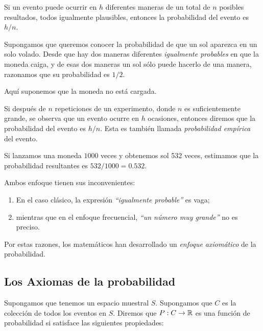 Si un evento puede ocurrir en $h$ diferentes maneras de un total de $n$ posibles resultados, todos igualmente plausibles, entonces la probabilidad del evento es $h/n.$


\begin{ejemplo}
	\label{exmp:1.10}
	Supongamos que queremos conocer la probabilidad de que un sol aparezca en un solo volado.  Desde que hay dos maneras diferentes \emph{igualmente probables} en que la moneda caiga,  y de esas dos maneras un sol sólo puede hacerlo de una manera, razonamos que su probabilidad es $1/2.$
	
	
	\begin{observacion}
		Aquí suponemos que la moneda no está cargada.
	\end{observacion}
	
\end{ejemplo}


Si después de $n$ repeticiones de un experimento, donde $n$ es suficientemente grande, se observa que un evento ocurre en $h$ ocasiones, entonces diremos que la probabilidad del evento es $h/n.$  Esta es también llamada \emph{probabilidad empírica} del evento.


\begin{ejemplo}
	\label{exmp:1.11}
	Si lanzamos una moneda $1000$ veces y obtenemos sol 532 veces, estimamos que la probabilidad resultantes es $532/1000=0.532$.
\end{ejemplo}



\begin{observacion}
	Ambos enfoque tienen sus inconvenientes:
	\begin{enumerate}
		\item En el caso clásico, la expresión \emph{``igualmente probable''} es vaga; 
		\item mientras que en el enfoque frecuencial, \emph{``un número muy grande''} no es preciso. 
	\end{enumerate}
	Por estas razones, los matemáticos han desarrollado un \emph{enfoque axiomático} de la probabilidad.
\end{observacion}


\subsection{Los Axiomas de la probabilidad}

Supongamos que tenemos un espacio muestral $S.$ Supongamos que $C$ es la colección de todos los eventos en $S.$ Diremos que $P:C \to \mathbb{R}$ es una función de probabilidad si satisface las siguientes propiedades:

